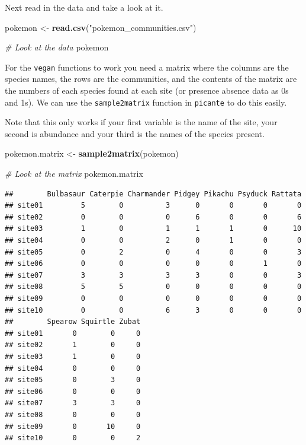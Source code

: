 \documentclass[]{book}
\newenvironment{Shaded}{\begin{snugshade}}{\end{snugshade}}
\newcommand{\KeywordTok}[1]{\textcolor[rgb]{0.13,0.29,0.53}{\textbf{{#1}}}}
\newcommand{\StringTok}[1]{\textcolor[rgb]{0.31,0.60,0.02}{{#1}}}
\newcommand{\CommentTok}[1]{\textcolor[rgb]{0.56,0.35,0.01}{\textit{{#1}}}}
\newcommand{\NormalTok}[1]{{#1}}
\begin{document}
Next read in the data and take a look at it.

\begin{Shaded}
\begin{Highlighting}[]
\NormalTok{pokemon <-}\StringTok{ }\KeywordTok{read.csv}\NormalTok{(}\StringTok{"pokemon_communities.csv"}\NormalTok{)}
\end{Highlighting}
\end{Shaded}

\begin{Shaded}
\begin{Highlighting}[]
\CommentTok{# Look at the data}
\NormalTok{pokemon}
\end{Highlighting}
\end{Shaded}

For the \texttt{vegan} functions to work you need a matrix where the
columns are the species names, the rows are the communities, and the
contents of the matrix are the numbers of each species found at each
site (or presence absence data as 0s and 1s). We can use the
\texttt{sample2matrix} function in \texttt{picante} to do this easily.

Note that this only works if your first variable is the name of the
site, your second is abundance and your third is the names of the
species present.

\begin{Shaded}
\begin{Highlighting}[]
\NormalTok{pokemon.matrix <-}\StringTok{ }\KeywordTok{sample2matrix}\NormalTok{(pokemon)}

\CommentTok{# Look at the matrix}
\NormalTok{pokemon.matrix}
\end{Highlighting}
\end{Shaded}

\begin{verbatim}
##        Bulbasaur Caterpie Charmander Pidgey Pikachu Psyduck Rattata
## site01         5        0          3      0       0       0       0
## site02         0        0          0      6       0       0       6
## site03         1        0          1      1       1       0      10
## site04         0        0          2      0       1       0       0
## site05         0        2          0      4       0       0       3
## site06         0        0          0      0       0       1       0
## site07         3        3          3      3       0       0       3
## site08         5        5          0      0       0       0       0
## site09         0        0          0      0       0       0       0
## site10         0        0          6      3       0       0       0
##        Spearow Squirtle Zubat
## site01       0        0     0
## site02       1        0     0
## site03       1        0     0
## site04       0        0     0
## site05       0        3     0
## site06       0        0     0
## site07       3        3     0
## site08       0        0     0
## site09       0       10     0
## site10       0        0     2
\end{verbatim}
\end{document}
